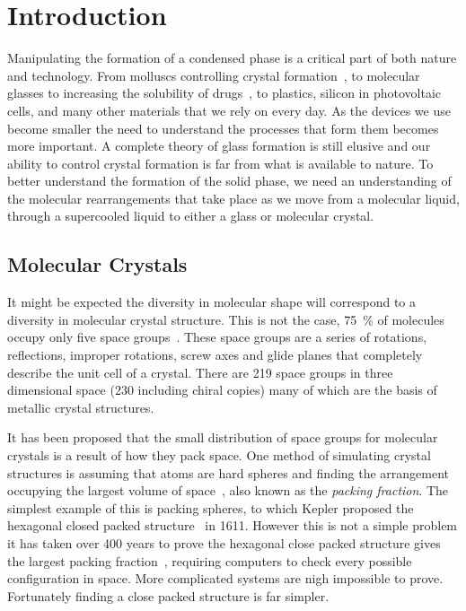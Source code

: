 
\chapter{Introduction}


Manipulating the formation of a condensed phase is a critical part of both nature and technology. From molluscs controlling crystal formation~\cite{de-yoreo:03}, to molecular glasses to increasing the solubility of drugs~\cite{hancock:00}, to plastics\tocite, silicon in photovoltaic cells\tocite, and many other materials that we rely on every day. As the devices we use become smaller the need to understand the processes that form them becomes more important. A complete theory of glass formation is still elusive and our ability to control crystal formation is far from what is available to nature. To better understand the formation of the solid phase, we need an understanding of the molecular rearrangements that take place as we move from a molecular liquid, through a supercooled liquid to either a glass or molecular crystal.

\section{Molecular Crystals}

It might be expected the diversity in molecular shape will correspond to a diversity in molecular crystal structure. This is not the case, \SI{75}{\percent} of molecules occupy only five space groups~\cite{brock:94}. These space groups are a series of rotations, reflections, improper rotations, screw axes and glide planes that completely describe the unit cell of a crystal. There are 219 space groups in three dimensional space (230 including chiral copies) many of which are the basis of metallic crystal structures\tocite.

It has been proposed that the small distribution of space groups for molecular crystals is a result of how they pack space\tocite. One method of simulating crystal structures is assuming that atoms are hard spheres and finding the arrangement occupying the largest volume of space~\cite{kitaigorodskii:73}, also known as the \emph{packing fraction}. The simplest example of this is packing spheres, to which Kepler proposed the hexagonal closed packed structure~\figref{} in 1611\cite{kepler:1611}. However this is not a simple problem it has taken over 400 years to prove the hexagonal close packed structure gives the largest packing fraction~\cite{hales:05,hales:14}, requiring computers to check every possible configuration in space. More complicated systems are nigh impossible to prove. Fortunately finding a close packed structure is far simpler.

